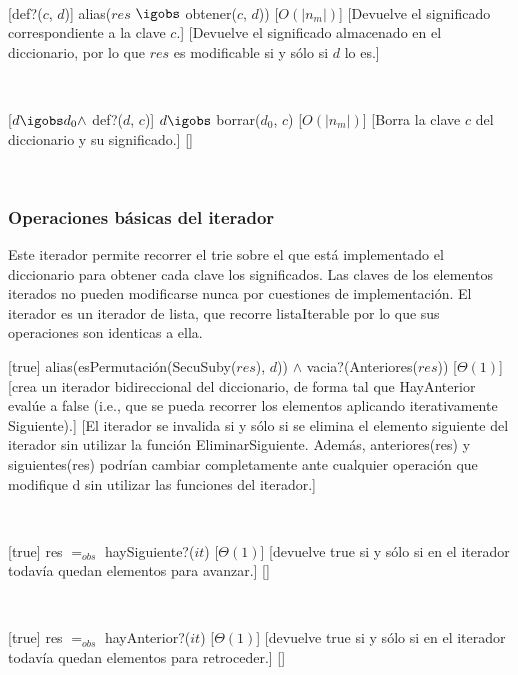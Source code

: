 ~

[def?($c$, $d$)]
{alias($res$ $\igobs$ obtener($c$, $d$))}
[$O(|n_m|)$]
[Devuelve el significado correspondiente a la clave $c$.]
[Devuelve el significado almacenado en el diccionario, por lo que $res$ es modificable si y sólo si $d$ lo es.]

~

[$ d \igobs d_0 \land $ def?($d$, $c$)]
{$ d \igobs$ borrar($d_0$, $c$)}
[$O(|n_m|)$]
[Borra la clave $c$ del diccionario y su significado.]
[]

~

\subsubsection{Operaciones básicas del iterador}

Este iterador permite recorrer el trie sobre el que est\'{a} implementado el diccionario para obtener cada clave los significados. Las claves de los elementos iterados no
pueden modificarse nunca por cuestiones de implementación. El iterador es un iterador de lista, que recorre listaIterable por lo que sus operaciones son identicas a ella.

[true]
{alias(esPermutación(SecuSuby($res$), $d$)) $\land$ vacia?(Anteriores($res$))}
[$\Theta(1)$]
[crea un iterador bidireccional del diccionario, de forma tal que HayAnterior evalúe a false (i.e.,
que se pueda recorrer los elementos aplicando iterativamente Siguiente).]
[El iterador se invalida si y sólo si se elimina el elemento siguiente del iterador sin utilizar la función
EliminarSiguiente. Además, anteriores(res) y siguientes(res) podrían cambiar completamente ante cualquier
operación que modifique d sin utilizar las funciones del iterador.]

~

[true]
{res $=_{obs}$ haySiguiente?($it$)}
[$\Theta(1)$]
[devuelve true si y sólo si en el iterador todavía quedan elementos para avanzar.]
[]

~

[true]
{res $=_{obs}$ hayAnterior?($it$)}
[$\Theta(1)$]
[devuelve true si y sólo si en el iterador todavía quedan elementos para retroceder.]
[]



